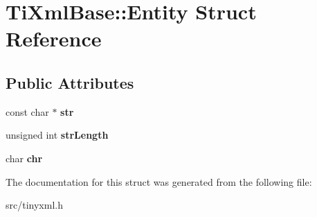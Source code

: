 \hypertarget{structTiXmlBase_1_1Entity}{
\section{\-Ti\-Xml\-Base\-:\-:\-Entity \-Struct \-Reference}
\label{d8/d33/structTiXmlBase_1_1Entity}
}
\subsection*{\-Public \-Attributes}
\begin{DoxyCompactItemize}
\item 
\hypertarget{structTiXmlBase_1_1Entity_ab721b5d4f7ed144ffd215947b38258b7}{
const char $\ast$ {\bfseries str}}
\label{d8/d33/structTiXmlBase_1_1Entity_ab721b5d4f7ed144ffd215947b38258b7}

\item 
\hypertarget{structTiXmlBase_1_1Entity_a22e8d820894d3360b01fed110badb876}{
unsigned int {\bfseries str\-Length}}
\label{d8/d33/structTiXmlBase_1_1Entity_a22e8d820894d3360b01fed110badb876}

\item 
\hypertarget{structTiXmlBase_1_1Entity_a2a7e1e68b93b4f76255c60c8fa7f738e}{
char {\bfseries chr}}
\label{d8/d33/structTiXmlBase_1_1Entity_a2a7e1e68b93b4f76255c60c8fa7f738e}

\end{DoxyCompactItemize}


\-The documentation for this struct was generated from the following file\-:\begin{DoxyCompactItemize}
\item 
src/tinyxml.\-h\end{DoxyCompactItemize}
